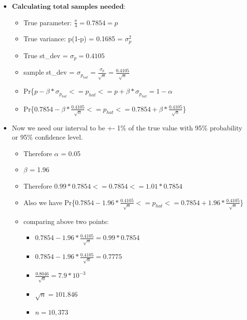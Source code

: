 \documentclass[11pt]{article}
\begin{document}
    \begin{itemize}
\item
  \(\textbf{Calculating total samples needed}\):

  \begin{itemize}
  \item
    True parameter: \(\frac{\pi}{4} = 0.7854 = p\)
  \item
    True variance: p(1-p) = 0.1685 = \(\sigma_{p}^2\)
  \item
    True st\_dev = \(\sigma_{p} = 0.4105\)
  \item
    sample st\_dev =
    \(\sigma_{p_{hat}} = \frac{\sigma_{p}}{\sqrt{n}} = \frac{0.4105}{\sqrt{n}}\)
  \item
    Pr\{\(p - \beta*\sigma_{p_{hat}} <= p_{hat} <= p + \beta*\sigma_{p_{hat}} = 1- \alpha\)
  \item
    Pr\{\(0.7854 - \beta*\frac{0.4105}{\sqrt{n}} <= p_{hat} <= 0.7854 + \beta*\frac{0.4105}{\sqrt{n}}\)\}
  \end{itemize}
\item
  Now we need our interval to be +- 1\% of the true value with 95\%
  probability or 95\% confidence level.

  \begin{itemize}
  \item
    Therefore \(\alpha\) = 0.05
  \item
    \(\beta\) = 1.96
  \item
    Therefore \(0.99*0.7854 <= 0.7854 <= 1.01*0.7854\)
  \item
    Also we have
    Pr\{\(0.7854 - 1.96*\frac{0.4105}{\sqrt{n}} <= p_{hat} <= 0.7854 + 1.96*\frac{0.4105}{\sqrt{n}}\)\}
  \item
    comparing above two points:

    \begin{itemize}
    \item
      \(0.7854 - 1.96*\frac{0.4105}{\sqrt{n}} = 0.99*0.7854\)
    \item
      \(0.7854 - 1.96*\frac{0.4105}{\sqrt{n}} = 0.7775\)
    \item
      \(\frac{0.8046}{\sqrt{n}} = 7.9 * 10^{-3}\)
    \item
      \(\sqrt{n} = 101.846\)
    \item
      \(n = 10,373\)
    \end{itemize}
  \end{itemize}
\end{itemize}
\end{document}
